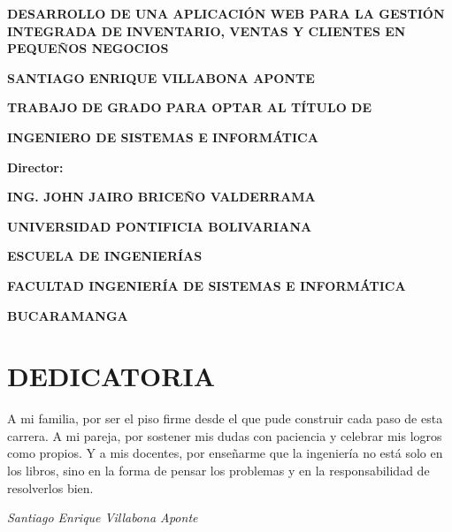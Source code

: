 \documentclass[spanish]{ieee_upb}
\begin{document}
\newpage
\thispagestyle{plain}
\begin{center}
	\vspace*{1cm}

	{\bfseries DESARROLLO DE UNA APLICACIÓN WEB PARA LA GESTIÓN INTEGRADA DE INVENTARIO, VENTAS Y CLIENTES EN PEQUEÑOS NEGOCIOS}

	\vspace{2cm}

	{\bfseries SANTIAGO ENRIQUE VILLABONA APONTE}

	\vspace{2cm}

	{\bfseries TRABAJO DE GRADO PARA OPTAR AL TÍTULO DE}

	\vspace{0.5cm}

	{\bfseries INGENIERO DE SISTEMAS E INFORMÁTICA}

	\vspace{2cm}

	{\bfseries Director:}

	{\bfseries ING. JOHN JAIRO BRICEÑO VALDERRAMA}

	\vfill

	{\bfseries UNIVERSIDAD PONTIFICIA BOLIVARIANA}

	{\bfseries ESCUELA DE INGENIERÍAS}

	{\bfseries FACULTAD INGENIERÍA DE SISTEMAS E INFORMÁTICA}

	{\bfseries BUCARAMANGA}

	{\bfseries \the\year}

\end{center}

\newpage
\section*{DEDICATORIA}

A mi familia, por ser el piso firme desde el que pude construir cada paso de esta carrera. A mi pareja, por sostener mis dudas con paciencia y celebrar mis logros como propios. Y a mis docentes, por enseñarme que la ingeniería no está solo en los libros, sino en la forma de pensar los problemas y en la responsabilidad de resolverlos bien.

\begin{flushright}
	\textit{Santiago Enrique Villabona Aponte}
\end{flushright}

\clearpage
\end{document}
